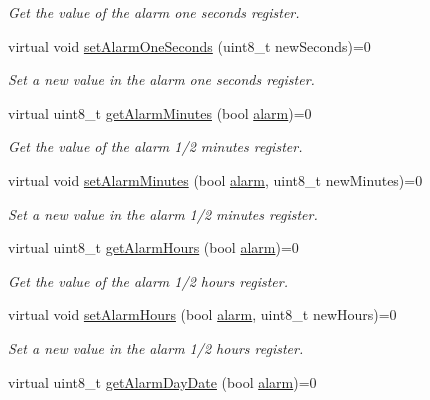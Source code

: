 \begin{DoxyCompactItemize}
\begin{DoxyCompactList}\small\item\em Get the value of the alarm one seconds register. \end{DoxyCompactList}\item 
virtual void \mbox{\hyperlink{classreal_time_clock_a448cbe8ab7f6649ee32eeb415721707f}{set\+Alarm\+One\+Seconds}} (uint8\+\_\+t new\+Seconds)=0
\begin{DoxyCompactList}\small\item\em Set a new value in the alarm one seconds register. \end{DoxyCompactList}\item 
virtual uint8\+\_\+t \mbox{\hyperlink{classreal_time_clock_a0b3babca96f8246d4bb5e3ac2a95801d}{get\+Alarm\+Minutes}} (bool \mbox{\hyperlink{classalarm}{alarm}})=0
\begin{DoxyCompactList}\small\item\em Get the value of the alarm 1/2 minutes register. \end{DoxyCompactList}\item 
virtual void \mbox{\hyperlink{classreal_time_clock_a53ffba88cd87d05af58288fb4fc589b5}{set\+Alarm\+Minutes}} (bool \mbox{\hyperlink{classalarm}{alarm}}, uint8\+\_\+t new\+Minutes)=0
\begin{DoxyCompactList}\small\item\em Set a new value in the alarm 1/2 minutes register. \end{DoxyCompactList}\item 
virtual uint8\+\_\+t \mbox{\hyperlink{classreal_time_clock_abca1ab557b357e3046d7d97eec89f750}{get\+Alarm\+Hours}} (bool \mbox{\hyperlink{classalarm}{alarm}})=0
\begin{DoxyCompactList}\small\item\em Get the value of the alarm 1/2 hours register. \end{DoxyCompactList}\item 
virtual void \mbox{\hyperlink{classreal_time_clock_a9f0cd64ce9a783f149fcbb9f7eb36524}{set\+Alarm\+Hours}} (bool \mbox{\hyperlink{classalarm}{alarm}}, uint8\+\_\+t new\+Hours)=0
\begin{DoxyCompactList}\small\item\em Set a new value in the alarm 1/2 hours register. \end{DoxyCompactList}\item 
virtual uint8\+\_\+t \mbox{\hyperlink{classreal_time_clock_afe0a54cb2f803d01df03e2ea8e86bbf9}{get\+Alarm\+Day\+Date}} (bool \mbox{\hyperlink{classalarm}{alarm}})=0

\end{DoxyCompactItemize}
